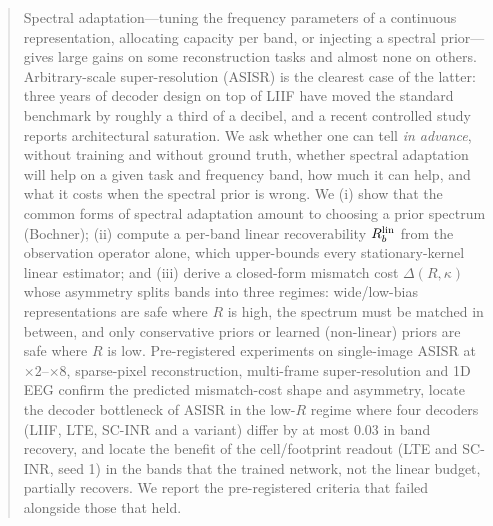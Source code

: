 \begin{abstract}
Spectral adaptation---tuning the frequency parameters of a continuous
representation, allocating capacity per band, or injecting a spectral
prior---gives large gains on some reconstruction tasks and almost none on
others. Arbitrary-scale super-resolution (ASISR) is the clearest case of the
latter: three years of decoder design on top of LIIF have moved the standard
benchmark by roughly a third of a decibel, and a recent controlled study
reports architectural saturation. We ask whether one can tell \emph{in
advance}, without training and without ground truth, whether spectral
adaptation will help on a given task and frequency band, how much it can
help, and what it costs when the spectral prior is wrong.
We (i) show that the common forms of spectral adaptation amount to choosing a
prior spectrum (Bochner); (ii) compute a per-band linear recoverability
$\Rlin$ from the observation operator alone, which upper-bounds every
stationary-kernel linear estimator; and (iii) derive a closed-form mismatch
cost $\Delta(R,\kappa)$ whose asymmetry splits bands into three regimes:
wide/low-bias representations are safe where $R$ is high, the spectrum must
be matched in between, and only conservative priors or learned (non-linear)
priors are safe where $R$ is low.
Pre-registered experiments on single-image ASISR at $\times2$--$\times8$,
sparse-pixel reconstruction, multi-frame super-resolution and 1D EEG confirm
the predicted mismatch-cost shape and asymmetry, locate the decoder
bottleneck of ASISR in the low-$R$ regime where four decoders (LIIF, LTE,
SC-INR and a variant) differ by at most 0.03 in band recovery, and locate the
benefit of the cell/footprint readout (LTE and SC-INR, seed 1) in the bands that the trained network, not the linear
budget, partially recovers. We report the pre-registered
criteria that failed alongside those that held.
\end{abstract}
